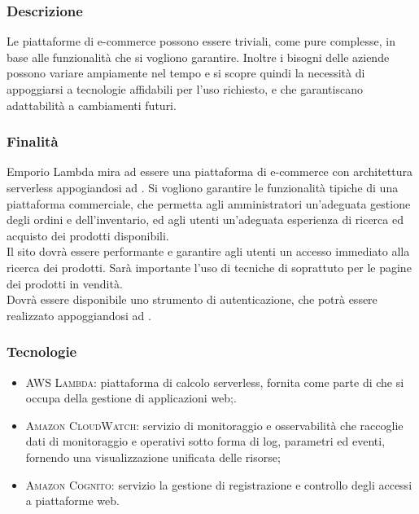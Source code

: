 \documentclass[]{article}
\begin{document}
			\subsubsection{Descrizione}
			Le piattaforme di e-commerce possono essere triviali, come pure complesse, in base alle funzionalità che si vogliono garantire. Inoltre i bisogni delle aziende possono variare ampiamente nel tempo e si scopre quindi la necessità di appoggiarsi a tecnologie affidabili per l'uso richiesto, e che garantiscano adattabilità a cambiamenti futuri.

			\subsubsection{Finalità}
			Emporio Lambda mira ad essere una piattaforma di e-commerce con architettura serverless appogiandosi ad . Si vogliono garantire le funzionalità tipiche di una piattaforma commerciale, che permetta agli amministratori un'adeguata gestione degli ordini e dell'inventario, ed agli utenti un'adeguata esperienza di ricerca ed acquisto dei prodotti disponibili. 
			\\
			Il sito dovrà essere performante e garantire agli utenti un accesso immediato alla ricerca dei prodotti. Sarà importante l'uso di tecniche di  soprattuto per le pagine dei prodotti in vendità. 
			\\
			Dovrà essere disponibile uno strumento di autenticazione, che potrà essere realizzato appoggiandosi ad .

			\subsubsection{Tecnologie}
			\begin{itemize}
				\item \textsc{AWS Lambda:} piattaforma di calcolo serverless, fornita come parte di  che si occupa della gestione  di applicazioni web;.
				\item \textsc{Amazon CloudWatch:} servizio di monitoraggio e osservabilità che raccoglie dati di monitoraggio e operativi sotto forma di log, parametri ed eventi, fornendo una visualizzazione unificata delle risorse;
				\item \textsc{Amazon Cognito:} servizio la gestione di registrazione e controllo degli accessi a piattaforme web.
			\end{itemize}
\end{document}

